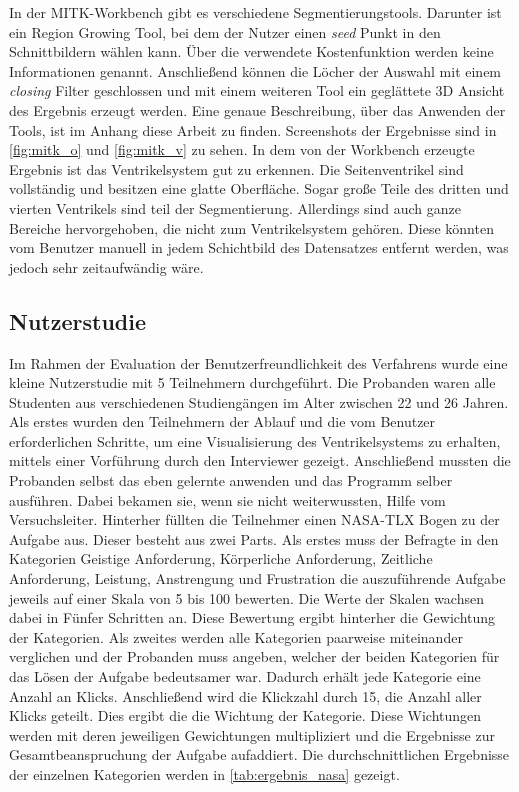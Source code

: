 In der MITK-Workbench gibt es verschiedene Segmentierungstools. Darunter ist ein Region Growing Tool, bei dem der Nutzer einen \textit{seed} Punkt in den Schnittbildern wählen kann. Über die verwendete Kostenfunktion werden keine Informationen genannt.
Anschließend können die Löcher der Auswahl mit einem \textit{closing} Filter geschlossen und mit einem weiteren Tool ein geglättete 3D Ansicht des Ergebnis erzeugt werden. Eine genaue Beschreibung, über das Anwenden der Tools, ist im Anhang diese Arbeit zu finden.
\newline
Screenshots der Ergebnisse sind in \autoref{fig:mitk_o} und \autoref{fig:mitk_v} zu sehen. In dem von der Workbench erzeugte Ergebnis ist das Ventrikelsystem gut zu erkennen. Die Seitenventrikel sind vollständig und besitzen eine glatte Oberfläche. Sogar große Teile des dritten und vierten Ventrikels sind teil der Segmentierung.
Allerdings sind auch ganze Bereiche hervorgehoben, die nicht zum Ventrikelsystem gehören. Diese könnten vom Benutzer manuell in jedem Schichtbild des Datensatzes entfernt werden, was jedoch sehr zeitaufwändig wäre.


\subsection{Nutzerstudie}


Im Rahmen der Evaluation der Benutzerfreundlichkeit des Verfahrens wurde eine kleine Nutzerstudie mit 5 Teilnehmern durchgeführt. Die Probanden waren alle Studenten aus verschiedenen Studiengängen im Alter zwischen 22 und 26 Jahren.
Als erstes wurden den Teilnehmern der Ablauf und die vom Benutzer erforderlichen Schritte, um eine Visualisierung des Ventrikelsystems zu erhalten, mittels einer Vorführung durch den Interviewer gezeigt.
Anschließend mussten die Probanden selbst das eben gelernte anwenden und das Programm selber ausführen. Dabei bekamen sie, wenn sie nicht weiterwussten, Hilfe vom Versuchsleiter.
\newline
Hinterher füllten die Teilnehmer einen NASA-TLX Bogen zu der Aufgabe aus. Dieser besteht aus zwei Parts. Als erstes muss der Befragte in den Kategorien Geistige Anforderung, Körperliche Anforderung, Zeitliche Anforderung, Leistung, Anstrengung und Frustration die auszuführende Aufgabe jeweils auf einer Skala von 5 bis 100 bewerten. Die Werte der Skalen wachsen dabei in Fünfer Schritten an. Diese Bewertung ergibt hinterher die Gewichtung der Kategorien.
Als zweites werden alle Kategorien paarweise miteinander verglichen und der Probanden muss angeben, welcher der beiden Kategorien für das Lösen der Aufgabe bedeutsamer war. Dadurch erhält jede Kategorie eine Anzahl an Klicks.
Anschließend wird die Klickzahl durch 15, die Anzahl aller Klicks geteilt. Dies ergibt die die Wichtung der Kategorie. Diese Wichtungen werden mit deren jeweiligen Gewichtungen multipliziert und die Ergebnisse zur Gesamtbeanspruchung der Aufgabe aufaddiert.
Die durchschnittlichen Ergebnisse der einzelnen Kategorien werden in \autoref{tab:ergebnis_nasa} gezeigt.


